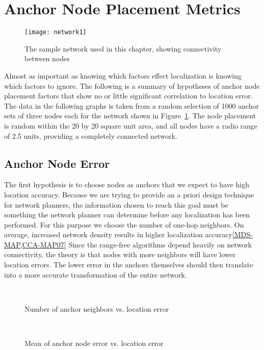 \section{Anchor Node Placement Metrics}
\begin{figure}
	\centering
		\texttt{[image: network1]}
	\caption[The sample network used in this chapter]{The sample network used in this chapter, showing connectivity between nodes}
	\label{fig:HypothesesNetwork}
\end{figure}

Almost as important as knowing which factors effect localization is knowing which factors to ignore. The following is a summary of hypotheses of anchor node placement factors that show no or little significant correlation to location error.  The data in the following graphs is taken from a random selection of 1000 anchor sets of three nodes each for the network shown in Figure~\ref{fig:HypothesesNetwork}.  The node placement is random within the 20 by 20 square unit area, and all nodes have a radio range of 2.5 units, providing a completely connected network.

\subsection{Anchor Node Error}
The first hypothesis is to choose nodes as anchors that we expect to have high location accuracy. Because we are trying to provide an a priori design technique for network planners, the information chosen to reach this goal must be something the network planner can determine before any localization has been performed.  For this purpose we choose the number of one-hop neighbors.  On average, increased network density results in higher  localization accuracy\ref{MDS-MAP,CCA-MAP07}  Since the range-free algorithms depend heavily on network connectivity, the theory is that nodes with more neighbors will have lower location errors.  The lower error in the anchors themselves should then translate into a more accurate transformation of the entire network.

\begin{figure}
  \centering
\\
	\caption{Number of anchor neighbors vs. location error}
	\label{fig:NumberOfAnchorNeighbors}
\end{figure}
\begin{figure}
  \centering
\\
	\caption{Mean of anchor node error vs. location error}
	\label{fig:MeanAnchorError}
\end{figure}

